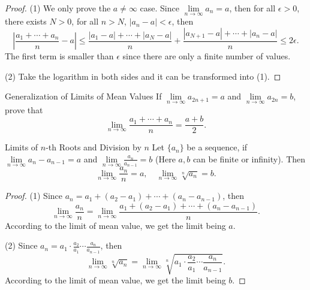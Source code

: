 \begin{proof}
  (1) We only prove the $a \neq \infty$ case. Since $\lim \limits _{n \rightarrow
    \infty} a_n = a$, then for all $\epsilon > 0$, there exists $N > 0$,
  for all $n > N$, $|a_n - a| < \epsilon$, then
  \begin{equation}
    \left| \frac{a_1 + \cdots + a_n}{n} - a \right| \leq
    \frac{|a_1 - a| + \cdots + |a_N - a|}{n} + \frac{|a_{N+1} - a| + \cdots + |a_n-a|}{n}
    \leq 2\epsilon.
  \end{equation}
  The first term is smaller than $\epsilon$ since there are only a finite number
  of values.

  (2) Take the logarithm in both sides and it can be transformed into (1).
\end{proof}

\begin{example}{Generalization of Limits of Mean Values}{}
  If $\lim \limits _{n \rightarrow \infty} a_{2n+1} = a$ and $\lim \limits _{n
    \rightarrow \infty} a_{2n} = b$, prove that
  \begin{equation}
    \lim \limits _{n \rightarrow \infty}  \frac{a_1 + \cdots + a_n}{n} = \frac{a+b}{2}.
  \end{equation}
\end{example}

\begin{proposition}{Limits of $n$-th Roots and Division by $n$}{}
  Let $\{a_n\}$ be a sequence, if $\lim \limits _{n \rightarrow \infty} a_n -
  a_{n-1} = a$ and $\lim \limits _{n \rightarrow \infty} \frac{a_n}{a_{n-1}} =
  b$ (Here $a, b$ can be finite or infinity). Then
  \begin{equation}
    \lim \limits _{n \rightarrow \infty} \frac{a_n}{n} = a, \quad
    \lim \limits _{n \rightarrow \infty} \sqrt[n]{a_n} = b.
  \end{equation}
\end{proposition}

\begin{proof}
  (1) Since $a_n = a_1 + (a_2 - a_1) + \cdots + (a_n - a_{n-1})$, then
  \begin{equation}
    \lim \limits _{n \rightarrow \infty} \frac{a_n}{n}
    = \lim \limits _{n \rightarrow \infty} \frac{a_1 + (a_2 - a_1) + \cdots + (a_n - a_{n-1})}{n}.
  \end{equation}
  According to the limit of mean value, we get the limit being $a$.

  (2) Since $a_n = a_1 \cdot \frac{a_2}{a_1} \cdots \frac{a_n}{a_{n-1}}$, then
  \begin{equation}
    \lim \limits _{n \rightarrow \infty} \sqrt[n]{a_n} = \lim \limits _{n \rightarrow \infty} 
    \sqrt[n]{a_1 \cdot \frac{a_2}{a_1} \cdots \frac{a_n}{a_{n-1}}}.
  \end{equation}
  According to the limit of mean value, we get the limit being $b$.
\end{proof}

